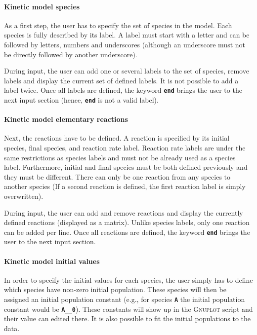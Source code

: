 \documentclass[a4paper,10pt,DIV=15,openany]{scrbook}
\newcommand{\ttt}[1]{\textbf{\texttt{#1}}}
\begin{document}
\paragraph{Kinetic model species}

As a first step, the user has to specify the set of species in the model.
Each species is fully described by its label.
A label must start with a letter and can be followed by letters, numbers and underscores (although an underscore must not be directly followed by another underscore).

During input, the user can add one or several labels to the set of species, remove labels and display the current set of defined labels.
It is not possible to add a label twice.
Once all labels are defined, the keyword \ttt{end} brings the user to the next input section (hence, \ttt{end} is not a valid label).

\paragraph{Kinetic model elementary reactions}

Next, the reactions have to be defined.
A reaction is specified by its initial species, final species, and reaction rate label.
Reaction rate labels are under the same restrictions as species labels and must not be already used as a species label.
Furthermore, initial and final species must be both defined previously and they must be different.
There can only be one reaction from any species to another species (If a second reaction is defined, the first reaction label is simply overwritten).

During input, the user can add and remove reactions and display the currently defined reactions (displayed as a matrix).
Unlike species labels, only one reaction can be added per line.
Once all reactions are defined, the keyword \ttt{end} brings the user to the next input section.

\paragraph{Kinetic model initial values}

In order to specify the initial values for each species, the user simply has to define which species have non-zero initial population.
These species will then be assigned an initial population constant (e.g., for species \ttt{A} the initial population constant would be \ttt{A\_\_0}).
These constants will show up in the \textsc{Gnuplot} script and their value can edited there.
It is also possible to fit the initial populations to the data.
\end{document}

